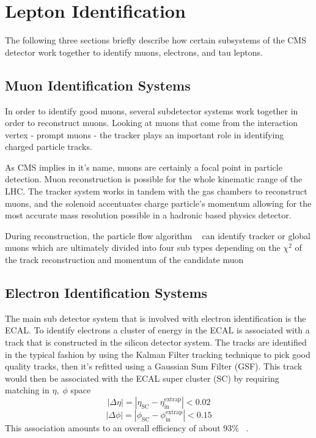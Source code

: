 \section{Lepton Identification}
The following three sections briefly describe how certain subsystems of the CMS detector work together to identify muons, electrons, and tau leptons. 

\subsection{Muon Identification Systems}

In order to identify good muons, several subdetector systems work together in order to reconstruct muons. Looking at muons that come from the interaction vertex - prompt muons - the tracker plays an important role in identifying charged particle tracks. 

As CMS implies in it's name, muons are certainly a focal point in particle detection. Muon reconstruction is possible for the whole kinematic range of the LHC. The tracker system works in tandem with the gas chambers to reconstruct muons, and the solenoid accentuates charge particle's momentum allowing for the most accurate mass resolution possible in a hadronic based physics detector.  


During reconstruction, the particle flow algorithm ~\cite{CMS-PAS-PFT-09-001} can identify tracker or global muons which are ultimately divided into four sub types depending on the $\chi^2$ of the track reconstruction and momentum of the candidate muon ~\cite{Kratschmer:1956760}


\subsection{Electron Identification Systems}

The main sub detector system that is involved with electron identification is the ECAL. To identify electrons a cluster of energy in the ECAL is associated with a track that is constructed in the silicon detector system. The tracks are identified in the typical fashion by using the Kalman Filter tracking technique to pick good quality tracks, then it's refitted using a Gaussian Sum Filter (GSF). This track would then be associated with the ECAL super cluster (SC) by requiring matching in $\eta,\;\phi$ space
\[|\Delta\eta| = |\eta_{\text{SC}} - \eta_{\text{in}}^{\text{extrap}}| < 0.02\]
\[|\Delta\phi| = |\phi_{\text{SC}} - \phi_{\text{in}}^{\text{extrap}}| < 0.15\]
This association amounts to an overall efficiency of about 93\% ~\cite{Khachatryan:2015hwa}. 


